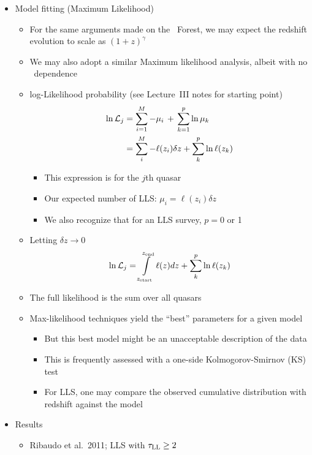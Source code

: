 \documentclass[12pt,letterpaper]{article}
\begin{document}
\begin{Aenumerate}
\begin{itemize}
\begin{itemize}
  	\end{itemize}

  \item Model fitting (Maximum Likelihood)
  	\begin{itemize}
  	\item For the same arguments made on the \lya\ Forest, 
  	we may expect the redshift evolution to scale as $(1+z)^\gamma$
  	\item We may also adopt a similar Maximum likelihood analysis, 
  	albeit with no \nhi\ dependence
  	\item log-Likelihood probability (see Lecture~III notes for starting point)
	\begin{align}
	\ln \mathcal{L}_j &= \sum\limits_{i=1}^M -\mu_i \, + \, \sum\limits_{k=1}^p \ln \mu_k \\
	&= \sum\limits_i^M -\ell(z_i) \delta z  + \sum\limits_{k}^p \ln \ell(z_k) 
	\label{eqn:max_LLS}
	\end{align}
  		\begin{itemize}
  		\item This expression is for the $j$th quasar
  		\item Our expected number of LLS: $\mu_i = \ell(z_i) \delta z$
  		\item We also recognize that for an LLS survey, $p = 0$ or 1
  		\end{itemize}
  	\item Letting $\delta z \to 0$
  	\begin{equation}
  	\ln \mathcal{L}_j = \int\limits_{z_{\rm start}}^{z_{\rm end}} \ell(z) dz
  	+ \sum\limits_{k}^p \ln \ell(z_k)
  	\end{equation}
  	\item The full likelihood is the sum over all quasars
  	\item Max-likelihood techniques yield the ``best'' parameters for
  		a given model
  		\begin{itemize}
  		\item But this best model might be an unacceptable description
  		of the data
  		\item This is frequently assessed with a one-side 
  		Kolmogorov-Smirnov (KS) test
  		\item For LLS, one may compare the observed
  		cumulative distribution with redshift against the model
  		\end{itemize}
  	\end{itemize}

  \item Results
  	\begin{itemize}
  	\item Ribaudo et al.\ 2011;  LLS with $\tau_{\rm LL} \ge 2$


\end{itemize}
\end{itemize}
\end{Aenumerate}
\end{document}
